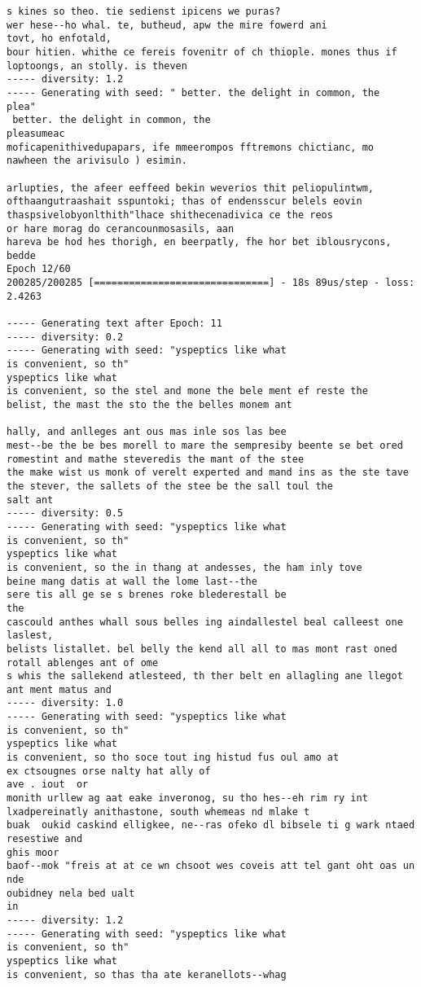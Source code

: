 \documentclass[11pt]{article}
\begin{document}
\begin{Verbatim}[commandchars=\\\{\}]
s kines so theo. tie sedienst ipicens we puras?
wer hese--ho whal. te, butheud, apw the mire fowerd ani
tovt, ho enfotald,
bour hitien. whithe ce fereis fovenitr of ch thiople. mones thus if loptoongs, an stolly. is theven
----- diversity: 1.2
----- Generating with seed: " better. the delight in common, the
plea"
 better. the delight in common, the
pleasumeac
moficapenithivedupapars, ife mmeerompos fftremons chictianc, mo nawheen the arivisulo ) esimin. 

arlupties, the afeer eeffeed bekin weverios thit peliopulintwm, ofthaangutraashait sspuntoki; thas of endensscur belels eovin thaspsivelobyonlthith"lhace shithecenadivica ce the reos
or hare morag do cerancounmosasils, aan
hareva be hod hes thorigh, en beerpatly, fhe hor bet iblousrycons, bedde
Epoch 12/60
200285/200285 [==============================] - 18s 89us/step - loss: 2.4263

----- Generating text after Epoch: 11
----- diversity: 0.2
----- Generating with seed: "yspeptics like what
is convenient, so th"
yspeptics like what
is convenient, so the stel and mone the bele ment ef reste the
belist, the mast the sto the the belles monem ant

hally, and anlleges ant ous mas inle sos las bee
mest--be the be bes morell to mare the sempresiby beente se bet ored romestint and mathe steveredis the mant of the stee
the make wist us monk of verelt experted and mand ins as the ste tave the stever, the sallets of the stee be the sall toul the
salt ant 
----- diversity: 0.5
----- Generating with seed: "yspeptics like what
is convenient, so th"
yspeptics like what
is convenient, so the in thang at andesses, the ham inly tove
beine mang datis at wall the lome last--the
sere tis all ge se s brenes roke blederestall be
the
cascould anthes whall sous belles ing aindallestel beal calleest one laslest,
belists listallet. bel belly the kend all all to mas mont rast oned rotall ablenges ant of ome
s whis the sallekend atlesteed, th ther belt en allagling ane llegot ant ment matus and 
----- diversity: 1.0
----- Generating with seed: "yspeptics like what
is convenient, so th"
yspeptics like what
is convenient, so tho soce tout ing histud fus oul amo at
ex ctsougnes orse nalty hat ally of
ave . iout  or
monith urllew ag aat eake inveronog, su tho hes--eh rim ry int lxadpereinatly anithastone, south whemeas nd mlake t
buak  oukid caskind elligkee, ne--ras ofeko dl bibsele ti g wark ntaed resestiwe and
ghis moor
baof--mok "freis at at ce wn chsoot wes coveis att tel gant oht oas un nde
oubidney nela bed ualt
in
----- diversity: 1.2
----- Generating with seed: "yspeptics like what
is convenient, so th"
yspeptics like what
is convenient, so thas tha ate keranellots--whag


\end{Verbatim}
\end{document}
